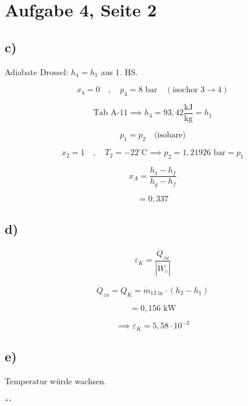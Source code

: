 \section*{Aufgabe 4, Seite 2}

\subsection*{c)}
Adiabate Drossel: \( h_4 = h_1 \) aus 1. HS.

\[
x_4 = 0 \quad , \quad p_4 = 8 \text{ bar} \quad (\text{isochor 3} \rightarrow 4)
\]

\[
\text{Tab A-11} \implies h_4 = 93,42 \frac{\text{kJ}}{\text{kg}} = h_1
\]

\[
p_1 = p_2 \quad \text{(isobare)}
\]

\[
x_2 = 1 \quad , \quad T_2 = -22^\circ \text{C} \implies p_2 = 1,21926 \text{ bar} = p_1
\]

\[
x_A = \frac{h_1 - h_f}{h_g - h_f}
\]

\[
= 0,337
\]

\subsection*{d)}
\[
\varepsilon_K = \frac{\dot{Q}_{zu}}{|\dot{W}_e|}
\]

\[
\dot{Q}_{zu} = \dot{Q}_K = \dot{m}_{13 \text{ in}} \cdot (h_2 - h_1)
\]

\[
= 0,156 \text{ kW}
\]

\[
\implies \varepsilon_K = 5,58 \cdot 10^{-3}
\]

\subsection*{e)}
Temperatur würde wachsen.

```
